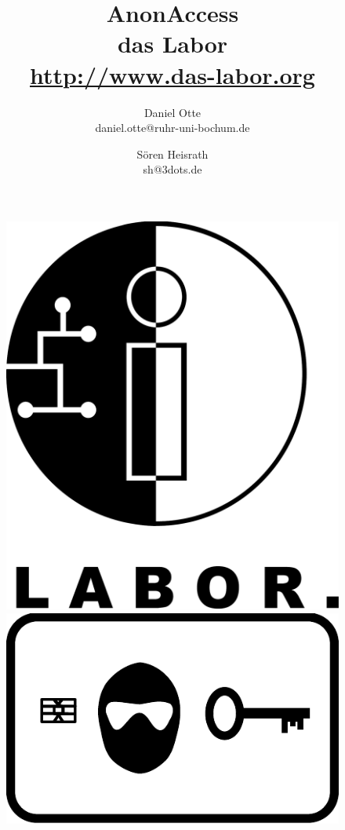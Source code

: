 \documentclass[10pt,a4paper,twocolumn]{article}
\author{Daniel Otte\\daniel.otte@ruhr-uni-bochum.de \and Sören Heisrath\\sh@3dots.de }
\title{\Huge{\textsf{AnonAccess}} \\ \normalsize{das Labor \\ \url{http://www.das-labor.org}}}
\begin{document}
 

\begin{figure}[t]
 \begin{minipage}[b]{.3\linewidth}
 \includegraphics[scale=0.15]{Labor} 
 \end{minipage}
 \hspace{0.3\linewidth}
 \begin{minipage}[b]{.3\linewidth}
 \includegraphics[scale=0.7]{AnonAccessLogo} 
 \end{minipage}
\end{figure}
\end{document}
